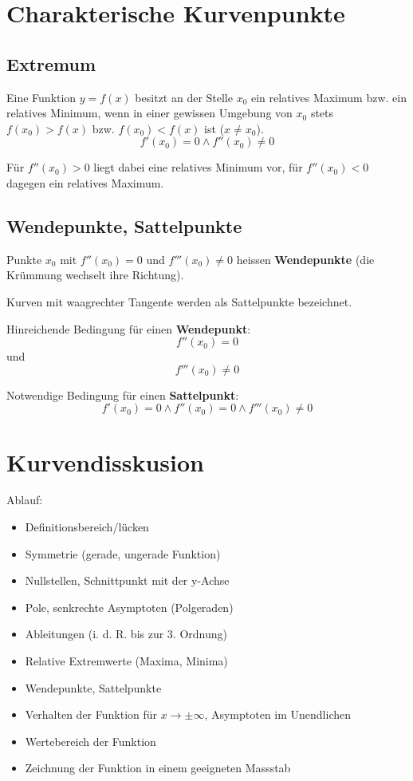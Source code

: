 \section{Charakterische Kurvenpunkte} %
\label{sec:charakterische_kurvenpunkte}
\subsection{Extremum} %
\label{sub:extremum}
Eine Funktion \(y = f(x) \) besitzt an der Stelle \(x_0\) ein relatives Maximum bzw. ein relatives Minimum, wenn in einer gewissen Umgebung von \(x_0\) stets \newline
\(f(x_0) > f(x) \) bzw. \( f(x_0) < f(x) \) \newline
ist (\(x \neq x_0\)).
	\[f'(x_0) = 0 \wedge f''(x_0) \neq 0 \]

Für \(f''(x_0) > 0 \) liegt dabei eine relatives Minimum vor, für \(f''(x_0) < 0 \) dagegen ein relatives Maximum.
\subsection{Wendepunkte, Sattelpunkte} %
Punkte \(x_0\) mit \(f''(x_0) = 0 \) und \(f'''(x_0) \neq 0 \) heissen \textbf{Wendepunkte} (die Krümmung wechselt ihre Richtung).
\par Kurven mit waagrechter Tangente werden als Sattelpunkte bezeichnet.
\par Hinreichende Bedingung für einen \textbf{Wendepunkt}: \newline
\[f''(x_0) = 0 \] und \[ f'''(x_0) \neq 0 \]
\par Notwendige Bedingung für einen \textbf{Sattelpunkt}: \newline
\[f'(x_0) = 0 \wedge f''(x_0) = 0 \wedge f'''(x_0) \neq 0 \]

\section{Kurvendisskusion}
Ablauf:\newline
\begin{itemize}
	\item Definitionsbereich/lücken
	\item Symmetrie (gerade, ungerade Funktion)
	\item Nullstellen, Schnittpunkt mit der y-Achse
	\item Pole, senkrechte Asymptoten (Polgeraden)
	\item Ableitungen (i. d. R. bis zur 3. Ordnung)
	\item Relative Extremwerte (Maxima, Minima)
	\item Wendepunkte, Sattelpunkte
	\item Verhalten der Funktion für \(x \rightarrow \pm \infty \), Asymptoten im Unendlichen
	\item Wertebereich der Funktion
	\item Zeichnung der Funktion in einem geeigneten Massstab
\end{itemize}